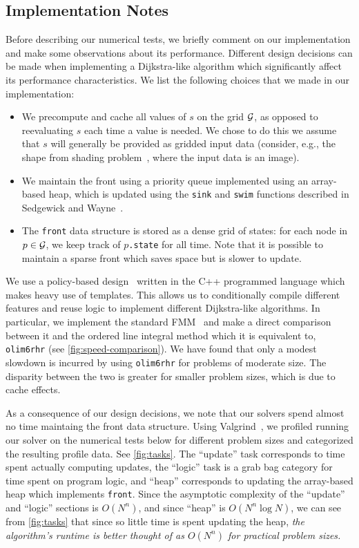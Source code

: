\documentclass[sisc-eikonal.tex]{subfiles}
\begin{document}
\subsection{Implementation Notes}\label{ssec:impl-notes}

Before describing our numerical tests, we briefly comment on our
implementation and make some observations about its
performance. Different design decisions can be made when implementing
a Dijkstra-like algorithm which significantly affect its performance
characteristics. We list the following choices that we made in our
implementation:
\begin{itemize}
\item We precompute and cache all values of $s$ on the grid $\mathcal{G}$,
  as opposed to reevaluating $s$ each time a value is needed. We chose
  to do this we assume that $s$ will generally be provided as gridded
  input data (consider, e.g., the shape from shading
  problem~\cite{kimmel2001optimal}, where the input data is an image).
\item We maintain the front using a priority queue implemented using
  an array-based heap, which is updated using the \texttt{sink} and
  \texttt{swim} functions described in Sedgewick and
  Wayne~\cite{sedgewick2011algorithms}.
\item The \texttt{front} data structure is stored as a dense grid of
  states: for each node in $p \in \mathcal{G}$, we keep track of
  $p$\texttt{.state} for all time. Note that it is possible to
  maintain a sparse front which saves space but is slower to update.
\end{itemize}

We use a policy-based design~\cite{alexandrescu2001modern} written in
the C++ programmed language which makes heavy use of templates. This
allows us to conditionally compile different features and reuse logic
to implement different Dijkstra-like algorithms. In particular, we
implement the standard FMM~\cite{sethian1996fast} and make a direct
comparison between it and the ordered line integral method which it is
equivalent to, \texttt{olim6rhr} (see \cref{fig:speed-comparison}). We
have found that only a modest slowdown is incurred by using
\texttt{olim6rhr} for problems of moderate size. The disparity between
the two is greater for smaller problem sizes, which is due to cache
effects.

As a consequence of our design decisions, we note that our solvers
spend almost no time maintaing the front data structure. Using
Valgrind~\cite{nethercote2007valgrind}, we profiled running our solver
on the numerical tests below for different problem sizes and
categorized the resulting profile data. See \cref{fig:tasks}. The
``update'' task corresponds to time spent actually computing updates,
the ``logic'' task is a grab bag category for time spent on program
logic, and ``heap'' corresponds to updating the array-based heap which
implements \texttt{front}. Since the asymptotic complexity of the
``update'' and ``logic'' sections is $O(N^n)$, and since ``heap'' is
$O(N^n \log N)$, we can see from \cref{fig:tasks} that since so little
time is spent updating the heap, \emph{the algorithm's runtime is
  better thought of as $O(N^n)$ for practical problem sizes.}
\end{document}

